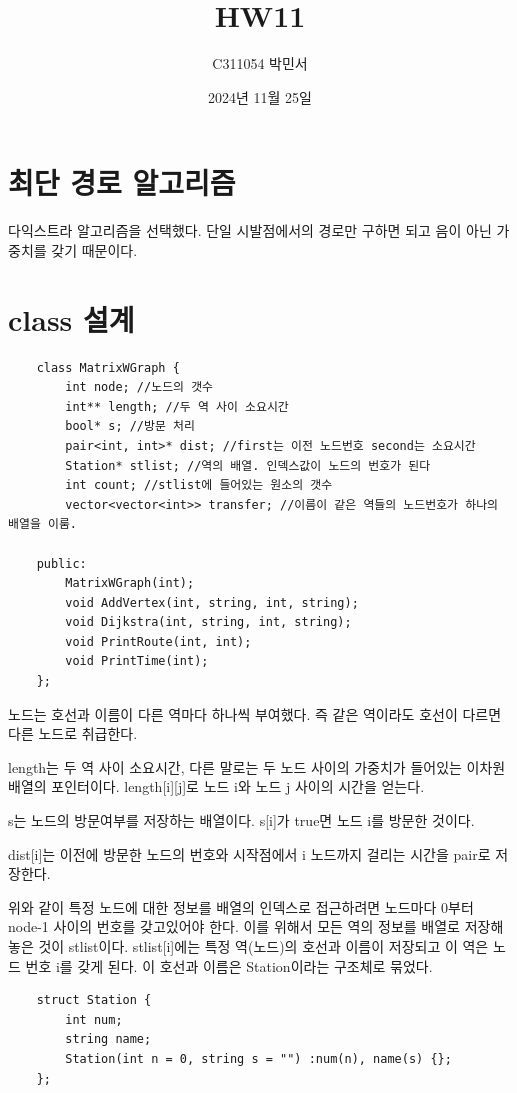 \documentclass{oblivoir}
\title{HW11}
\author{C311054 박민서}
\date{2024년 11월 25일}
\begin{document}
\maketitle

\section{최단 경로 알고리즘}
다익스트라 알고리즘을 선택했다.
단일 시발점에서의 경로만 구하면 되고 음이 아닌 가중치를 갖기 때문이다.

\section{class 설계}
\begin{verbatim}
    class MatrixWGraph {
    	int node; //노드의 갯수
    	int** length; //두 역 사이 소요시간
    	bool* s; //방문 처리
    	pair<int, int>* dist; //first는 이전 노드번호 second는 소요시간
    	Station* stlist; //역의 배열. 인덱스값이 노드의 번호가 된다
    	int count; //stlist에 들어있는 원소의 갯수
    	vector<vector<int>> transfer; //이름이 같은 역들의 노드번호가 하나의 배열을 이룸.
    
    public:
    	MatrixWGraph(int);
    	void AddVertex(int, string, int, string);
    	void Dijkstra(int, string, int, string);
    	void PrintRoute(int, int);
    	void PrintTime(int);
    };
\end{verbatim}
노드는 호선과 이름이 다른 역마다 하나씩 부여했다.
즉 같은 역이라도 호선이 다르면 다른 노드로 취급한다.

length는 두 역 사이 소요시간, 다른 말로는 두 노드 사이의 가중치가 들어있는 이차원 배열의 포인터이다. length[i][j]로 노드 i와 노드 j 사이의 시간을 얻는다.

s는 노드의 방문여부를 저장하는 배열이다. s[i]가 true면 노드 i를 방문한 것이다.

dist[i]는 이전에 방문한 노드의 번호와 시작점에서 i 노드까지 걸리는 시간을 pair로 저장한다.

위와 같이 특정 노드에 대한 정보를 배열의 인덱스로 접근하려면 노드마다 0부터 node-1 사이의 번호를 갖고있어야 한다.
이를 위해서 모든 역의 정보를 배열로 저장해놓은 것이 stlist이다.
stlist[i]에는 특정 역(노드)의 호선과 이름이 저장되고 이 역은 노드 번호 i를 갖게 된다.
이 호선과 이름은 Station이라는 구조체로 묶었다.
\begin{verbatim}
    struct Station {
    	int num;
    	string name;
    	Station(int n = 0, string s = "") :num(n), name(s) {};
    };
\end{verbatim}
\end{document}

